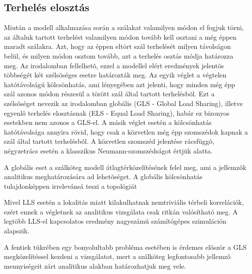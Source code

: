 \subsection{Terhelés elosztás}
\par Miután a modell alkalmazása során a szálakat valamilyen módon el fogjuk
törni, az általuk tartott terhelést valamilyen módon tovább kell osztani a még éppen
maradt szálakra. Azt, hogy az éppen eltört szál terhelését milyen
távolságon belül, és milyen módon osztom tovább, azt a terhelés osztás módja
határozza meg. Az irodalomban fellelhetõ, ezzel a modellel elért eredmények
jelentõs többségét két szélsõséges esetre határozták meg. Az egyik véglet a
végtelen hatótávolságú kölcsönhatás, ami lényegében azt jelenti, hogy minden
még épp szál azonos módon részesül a törött szál által tartott terhelésbõl. Ezt
a szélsõséget nevezik az irodalomban globális (GLS - Global Load Sharing), 
illetve egyenlõ terhelés elosztásnak (ELS - Equal Load Sharing), habár ez
bizonyos esetekben nem azonos a GLS-el. A másik véglet esetén a kölcsönhatás
hatótávolsága annyira rövid, hogy csak a közvetlen még épp szomszédok kapnak a
szál által tartott terhelésbõl. A közvetlen szomszéd jelentése rácsfüggõ,
négyzetrács esetén a klasszikus Neumann-szomszédságot értjük alatta.
\par A globális eset a szálköteg modell átlagtérközelítésének felel meg,  ami a
jellemzõk analitikus meghatározására ad lehetõséget. A globális kölcsönhatás
tulajdonképpen irrelevánsá teszi a topológiát 
\par Mivel LLS esetén a lokalitás miatt kilakulhatnak nemtriviális térbeli
korrelációk, ezért ennek a végletnek az analitikus vizsgálata csak ritkán 
valósítható meg. A legtöbb LLS-el kapcsolatos eredmény nagyszámú számítógépes
szimuláción alapszik.
\par A fentiek tükrében egy bonyolultabb probléma esetében
is érdemes elõször a GLS megközelítéssel kezdeni a vizsgálatot, mert a szálköteg legfontosabb
jellemzõ mennyiségeit zárt analitikus alakban határozhatjuk meg vele.

